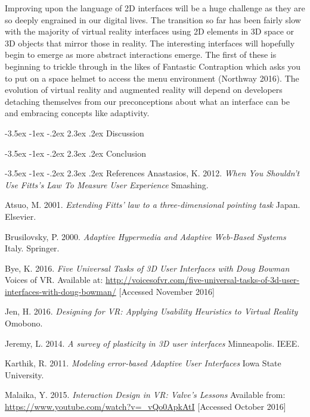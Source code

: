 \documentclass[12pt]{article}
\makeatletter
\renewcommand{\section}{\@startsection {section}{1}{\z@}%
             {-3.5ex \@plus -1ex \@minus -.2ex}%
             {2.3ex \@plus .2ex}%
             {\normalfont\Large\scshape\bfseries}}
\makeatother
\begin{document}
Improving upon the language of 2D interfaces will be a huge challenge as they are so deeply engrained in our digital lives. The transition so far has been fairly slow with the majority of virtual reality interfaces using 2D elements in 3D space or 3D objects that mirror those in reality. The interesting interfaces will hopefully begin to emerge as more abstract interactions emerge. The first of these is beginning to trickle through in the likes of Fantastic Contraption which asks you to put on a space helmet to access the menu environment (Northway 2016). The evolution of virtual reality and augmented reality will depend on developers detaching themselves from our preconceptions about what an interface can be and embracing concepts like adaptivity.

\section{Discussion}

\section{Conclusion}

\pagebreak

\section{References}
Anastasios, K. 2012. \emph{When You Shouldn't Use Fitts's Law To Measure User Experience} Smashing. 

Atsuo, M. 2001. \emph{Extending Fitts' law to a three-dimensional pointing task} Japan. Elsevier. 

Brusilovsky, P. 2000. \emph{Adaptive Hypermedia and Adaptive Web-Based Systems} Italy. Springer.

Bye, K. 2016. \emph{Five Universal Tasks of 3D User Interfaces with Doug Bowman} Voices of VR. Available at: \url{http://voicesofvr.com/five-universal-tasks-of-3d-user-interfaces-with-doug-bowman/} [Accessed November 2016]

Jen, H. 2016. \emph{Designing for VR: Applying Usability Heuristics to Virtual Reality} Omobono. 

Jeremy, L. 2014. \emph{A survey of plasticity in 3D user interfaces} Minneapolis. IEEE. 

Karthik, R. 2011. \emph{Modeling error-based Adaptive User Interfaces} Iowa State University. 

Malaika, Y. 2015. \emph{Interaction Design in VR: Valve's Lessons } Available from: \url{https://www.youtube.com/watch?v=_vQo0ApkAtI} [Accessed October 2016]
\end{document}
